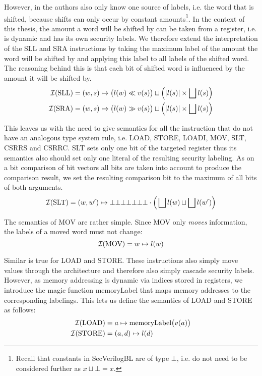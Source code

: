 However, in \cite{Ferraiuolo17} the authors also only know one source of labels, i.e. the word that is shifted, because shifts can only occur by constant amounts\footnote{%
    Recall that constants in SecVerilogBL are of type $ \bot $, i.e. do not need to be considered further as $ x \sqcup \bot = x $.
}.
In the context of this thesis, the amount a word will be shifted by can be taken from a register, i.e. is dynamic and has its own security labels.
We therefore extend the interpretation of the SLL and SRA instructions by taking the maximum label of the amount the word will be shifted by and applying this label to all labels of the shifted word.
The reasoning behind this is that each bit of shifted word is influenced by the amount it will be shifted by.
\begin{align*}
    \mathcal{I}(\text{SLL}) &= (w, s) \mapsto \big(l(w) \ll v(s) \big) \sqcup \Big(|l(s)| \times \bigsqcup l(s) \Big) \\
    \mathcal{I}(\text{SRA}) &= (w, s) \mapsto \big(l(w) \gg v(s) \big) \sqcup \Big(|l(s)| \times \bigsqcup l(s) \Big)
\end{align*}

This leaves us with the need to give semantics for all the instruction that do not have an analogous type system rule, i.e. LOAD, STORE, LOADI, MOV, SLT, CSRRS and CSRRC.
SLT sets only one bit of the targeted register thus its semantics also should set only one literal of the resulting security labeling.
As on a bit comparison of bit vectors all bits are taken into account to produce the comparison result, we set the resulting comparison bit to the maximum of all bits of both arguments.
\begin{equation*}
    \mathcal{I}(\text{SLT}) = (w, w') \mapsto \bot\bot\bot\bot\bot\bot\bot \cdot \Big(\bigsqcup l(w) \sqcup \bigsqcup l(w') \Big)
\end{equation*}

The semantics of MOV are rather simple.
Since MOV only \textit{moves} information, the labels of a moved word must not change:
\begin{equation*}
    \mathcal{I}(\text{MOV}) = w \mapsto l(w)
\end{equation*}

Similar is true for LOAD and STORE.
These instructions also simply move values through the architecture and therefore also simply cascade security labels.
However, as memory addressing is dynamic via indices stored in registers, we introduce the magic function memoryLabel that maps memory addresses to the corresponding labelings.
This lets us define the semantics of LOAD and STORE as follows:
\begin{align*}
    \mathcal{I}(\text{LOAD}) &= a \mapsto \text{memoryLabel}\big(v(a) \big) \\
    \mathcal{I}(\text{STORE}) &= (a, d) \mapsto l(d)
\end{align*}

